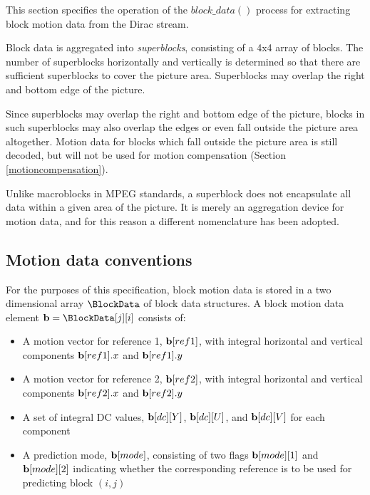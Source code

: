 
\label{motiondec}

This section specifies the operation of the $block\_data()$ process for extracting
block motion data from the Dirac stream. 

Block data is aggregated into {\em superblocks}, consisting of a 4x4 array of blocks. The number 
of superblocks horizontally and vertically is determined so that there are sufficient superblocks
to cover the picture area. Superblocks may overlap the right and bottom edge of the picture.

\begin{informative}
Since superblocks may overlap the right and bottom edge of the picture, blocks in such superblocks
may also overlap the edges or even fall outside the picture area altogether. Motion data for 
blocks which fall outside the picture area is still decoded, but will not be used for motion compensation 
(Section \ref{motioncompensation}). 

Unlike macroblocks in MPEG standards, a superblock does not encapsulate all data within a 
given area of the picture. It is merely an aggregation device for motion data, and for this reason
a different nomenclature has been adopted.
\end{informative}

\subsection{Motion data conventions}

\label{motionconventions}

For the purposes of this specification, block motion data is stored in a two dimensional array 
$\BlockData$ of block data structures. A block motion data element ${\bf b}=\BlockData[j][i]$ consists of:

\begin{itemize}
\item A motion vector for reference 1, ${\bf b}[ref1]$, with integral horizontal and vertical components 
${\bf b}[ref1].x$ and ${\bf b}[ref1].y$
\item A motion vector for reference 2, ${\bf b}[ref2]$, with integral horizontal and vertical components 
${\bf b}[ref2].x$ and ${\bf b}[ref2].y$
\item A set of integral DC values, ${\bf b}[dc][Y]$, ${\bf b}[dc][U]$, and ${\bf b}[dc][V]$ for each component
\item A prediction mode, ${\bf b}[mode]$, consisting of two flags ${\bf b}[mode][1]$ and ${\bf b}[mode][2]$ 
indicating whether the corresponding reference is to be used for predicting block $(i,j)$
\end{itemize}

